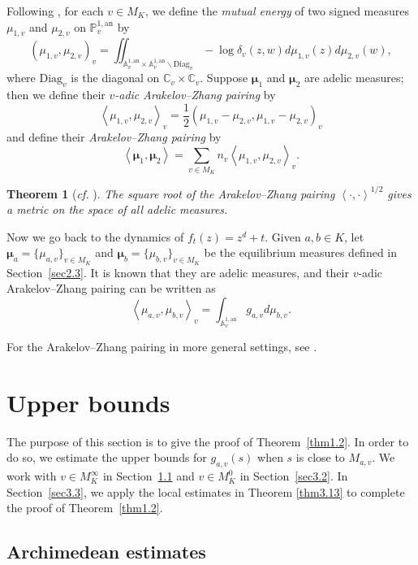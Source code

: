 \documentclass[11pt]{amsart}
\numberwithin{equation}{section}
\theoremstyle{plain}
\newtheorem{thm}{Theorem}[section]
\theoremstyle{definition}
\theoremstyle{remark}
\newcommand{\A}{\mathbb A}
\newcommand{\C}{\mathbb C}
\newcommand{\PP}{\mathbb P}
\newcommand{\an}{\mathrm{an}}
\newcommand{\Diag}{\mathrm{Diag}}
\begin{document}
Following \cite[Sections 2.4 and 4.4]{FRL}, for each $v\in M_{K}$,
we define the \textit{mutual energy} of two signed measures $\mu_{1,v}$
and $\mu_{2,v}$ on $\PP_{v}^{1,\an}$ by
\[
\left(\mu_{1,v},\mu_{2,v}\right)_{v}=\iint_{\A_{v}^{1,\an}\times\A_{v}^{1,\an}\backslash\Diag_{v}}-\log\delta_{v}(z,w)d\mu_{1,v}(z)d\mu_{2,v}(w),
\]
where $\Diag_{v}$ is the diagonal on $\C_{v}\times\C_{v}$.
Suppose $\boldsymbol{\mu}_{1}$ and $\boldsymbol{\mu}_{2}$ are adelic
measures; then we define their \textit{$v$-adic Arakelov--Zhang
pairing} by
\[
\left\langle \mu_{1,v},\mu_{2,v}\right\rangle _{v}=\frac{1}{2}\left(\mu_{1,v}-\mu_{2,v},\mu_{1,v}-\mu_{2,v}\right)_{v} 
\]
and define their \textit{Arakelov--Zhang pairing} by
\[
\left\langle \boldsymbol{\mu}_{1},\boldsymbol{\mu}_{2}\right\rangle =\sum_{v\in M_{K}}n_{v}\left\langle \mu_{1,v},\mu_{2,v}\right\rangle _{v}.
\]

\begin{thm}[\textit{cf.} {\cite[Theorem 1]{Fi}}]\label{thm2.3}
The square root of the Arakelov--Zhang
pairing $\left\langle \cdot,\cdot\right\rangle ^{1/2}$ gives a metric
on the space of all adelic measures.
\end{thm}

Now we go back to the dynamics of $f_{t}(z)=z^{d}+t$. Given $a,b\in K$,
let $\boldsymbol{\mu}_{a}=\{\mu_{a,v}\}_{v\in M_{K}}$ and $\boldsymbol{\mu}_{b}=\{\mu_{b,v}\}_{v\in M_{K}}$
be the equilibrium measures defined in Section~\ref{sec2.3}. It is
known that they are adelic measures, and their $v$-adic Arakelov--Zhang
pairing can be written as
\[
\left\langle \mu_{a,v},\mu_{b,v}\right\rangle _{v}=\int_{\A_{v}^{1,\an}}g_{a,v}d\mu_{b,v}.
\]

For the Arakelov--Zhang pairing in more general settings,
see \cite{Zh,PST,CL2}.

\section{Upper bounds}\label{sec3}

The purpose of this section is to give the proof of Theorem~\ref{thm1.2}.
In order to do so, we estimate the upper bounds for $g_{a,v}(s)$
when $s$ is close to $M_{a,v}$. We work with $v\in M_{K}^{\infty}$
in Section~\ref{sec3.1} and $v\in M_{K}^{0}$ in Section~\ref{sec3.2}.
In Section~\ref{sec3.3}, we apply the local estimates in Theorem
\ref{thm3.13} to complete the proof of Theorem~\ref{thm1.2}.

\subsection{Archimedean estimates}\label{sec3.1}
\end{document}
